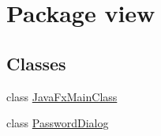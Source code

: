\hypertarget{namespaceview}{}\section{Package view}
\label{namespaceview}
\subsection*{Classes}
\begin{DoxyCompactItemize}
\item 
class \mbox{\hyperlink{classview_1_1_java_fx_main_class}{Java\+Fx\+Main\+Class}}
\item 
class \mbox{\hyperlink{classview_1_1_password_dialog}{Password\+Dialog}}
\end{DoxyCompactItemize}
